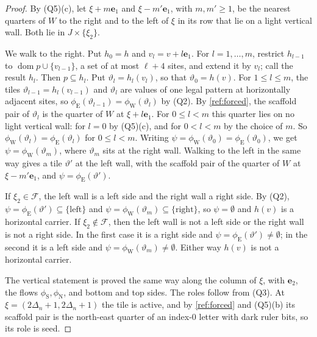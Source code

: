 \begin{proof}
By (Q5)(c), let $\xi+m\mathbf e_1$ and $\xi-m'\mathbf e_1$, with $m,m'\ge1$, be the nearest quarters of $W$ to the right and to the left of $\xi$ in its row that lie on a light vertical wall. Both lie in $J\times\{\xi_2\}$.

We walk to the right. Put $h_0=h$ and $v_l=v+l\mathbf e_1$. For $l=1,\dots,m$, restrict $h_{l-1}$ to $\operatorname{dom}p\cup\{v_{l-1}\}$, a set of at most $\ell+4$ sites, and extend it by $v_l$; call the result $h_l$. Then $p\subseteq h_l$. Put $\vartheta_l=h_l(v_l)$, so that $\vartheta_0=h(v)$. For $1\le l\le m$, the tiles $\vartheta_{l-1}=h_l(v_{l-1})$ and $\vartheta_l$ are values of one legal pattern at horizontally adjacent sites, so $\phi_{\mathrm E}(\vartheta_{l-1})=\phi_{\mathrm W}(\vartheta_l)$ by (Q2). By \cref{ref:forced}, the scaffold pair of $\vartheta_l$ is the quarter of $W$ at $\xi+l\mathbf e_1$. For $0\le l<m$ this quarter lies on no light vertical wall: for $l=0$ by (Q5)(c), and for $0<l<m$ by the choice of $m$. So $\phi_{\mathrm W}(\vartheta_l)=\phi_{\mathrm E}(\vartheta_l)$ for $0\le l<m$. Writing $\psi=\phi_{\mathrm W}(\vartheta_0)=\phi_{\mathrm E}(\vartheta_0)$, we get $\psi=\phi_{\mathrm W}(\vartheta_m)$, where $\vartheta_m$ sits at the right wall. Walking to the left in the same way gives a tile $\vartheta'$ at the left wall, with the scaffold pair of the quarter of $W$ at $\xi-m'\mathbf e_1$, and $\psi=\phi_{\mathrm E}(\vartheta')$.

If $\xi_2\in\mathcal F$, the left wall is a left side and the right wall a right side. By (Q2), $\psi=\phi_{\mathrm E}(\vartheta')\subseteq\{\mathrm{left}\}$ and $\psi=\phi_{\mathrm W}(\vartheta_m)\subseteq\{\mathrm{right}\}$, so $\psi=\emptyset$ and $h(v)$ is a horizontal carrier. If $\xi_2\notin\mathcal F$, then the left wall is not a left side or the right wall is not a right side. In the first case it is a right side and $\psi=\phi_{\mathrm E}(\vartheta')\ne\emptyset$; in the second it is a left side and $\psi=\phi_{\mathrm W}(\vartheta_m)\ne\emptyset$. Either way $h(v)$ is not a horizontal carrier.

The vertical statement is proved the same way along the column of $\xi$, with $\mathbf e_2$, the flows $\phi_{\mathrm S},\phi_{\mathrm N}$, and bottom and top sides. The roles follow from (Q3). At $\xi=(2\Delta_n+1,2\Delta_n+1)$ the tile is active, and by \cref{ref:forced} and (Q5)(b) its scaffold pair is the north-east quarter of an index-$0$ letter with dark ruler bits, so its role is seed.
\end{proof}

